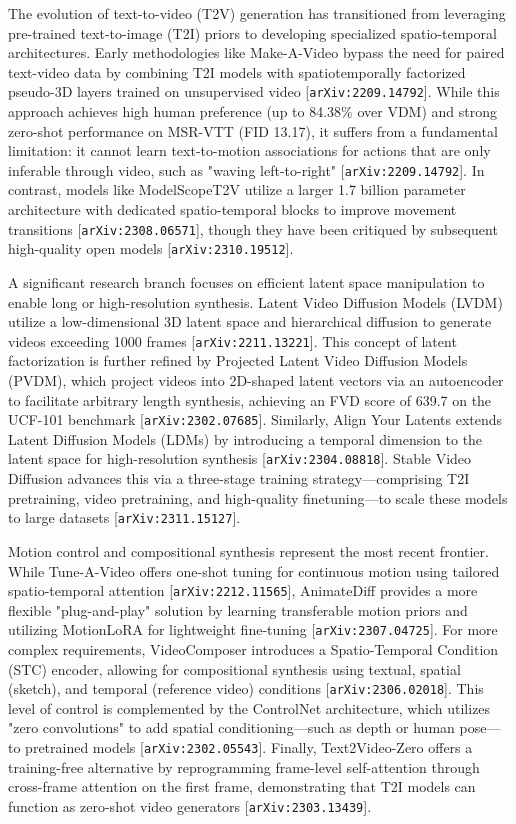 \documentclass[11pt]{article}
\begin{document}
The evolution of text-to-video (T2V) generation has transitioned from leveraging pre-trained text-to-image (T2I) priors to developing specialized spatio-temporal architectures. Early methodologies like Make-A-Video bypass the need for paired text-video data by combining T2I models with spatiotemporally factorized pseudo-3D layers trained on unsupervised video [\texttt{arXiv:2209.14792}]. While this approach achieves high human preference (up to 84.38\% over VDM) and strong zero-shot performance on MSR-VTT (FID 13.17), it suffers from a fundamental limitation: it cannot learn text-to-motion associations for actions that are only inferable through video, such as "waving left-to-right" [\texttt{arXiv:2209.14792}]. In contrast, models like ModelScopeT2V utilize a larger 1.7 billion parameter architecture with dedicated spatio-temporal blocks to improve movement transitions [\texttt{arXiv:2308.06571}], though they have been critiqued by subsequent high-quality open models [\texttt{arXiv:2310.19512}].

A significant research branch focuses on efficient latent space manipulation to enable long or high-resolution synthesis. Latent Video Diffusion Models (LVDM) utilize a low-dimensional 3D latent space and hierarchical diffusion to generate videos exceeding 1000 frames [\texttt{arXiv:2211.13221}]. This concept of latent factorization is further refined by Projected Latent Video Diffusion Models (PVDM), which project videos into 2D-shaped latent vectors via an autoencoder to facilitate arbitrary length synthesis, achieving an FVD score of 639.7 on the UCF-101 benchmark [\texttt{arXiv:2302.07685}]. Similarly, Align Your Latents extends Latent Diffusion Models (LDMs) by introducing a temporal dimension to the latent space for high-resolution synthesis [\texttt{arXiv:2304.08818}]. Stable Video Diffusion advances this via a three-stage training strategy—comprising T2I pretraining, video pretraining, and high-quality finetuning—to scale these models to large datasets [\texttt{arXiv:2311.15127}].

Motion control and compositional synthesis represent the most recent frontier. While Tune-A-Video offers one-shot tuning for continuous motion using tailored spatio-temporal attention [\texttt{arXiv:2212.11565}], AnimateDiff provides a more flexible "plug-and-play" solution by learning transferable motion priors and utilizing MotionLoRA for lightweight fine-tuning [\texttt{arXiv:2307.04725}]. For more complex requirements, VideoComposer introduces a Spatio-Temporal Condition (STC) encoder, allowing for compositional synthesis using textual, spatial (sketch), and temporal (reference video) conditions [\texttt{arXiv:2306.02018}]. This level of control is complemented by the ControlNet architecture, which utilizes "zero convolutions" to add spatial conditioning—such as depth or human pose—to pretrained models [\texttt{arXiv:2302.05543}]. Finally, Text2Video-Zero offers a training-free alternative by reprogramming frame-level self-attention through cross-frame attention on the first frame, demonstrating that T2I models can function as zero-shot video generators [\texttt{arXiv:2303.13439}].
\end{document}

